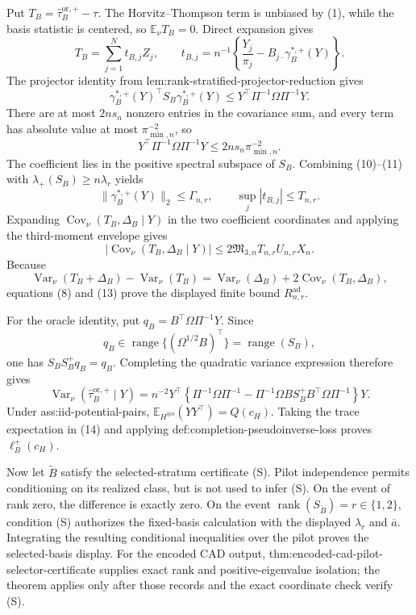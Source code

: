 Put \(T_B=\widehat\tau_B^{\mathrm{or},+}-\tau\).  The Horvitz--Thompson term is unbiased by (1), while the basis statistic is centered, so \(\mathbb E_\nu T_B=0\).  Direct expansion gives
\[
T_B=\sum_{j=1}^{N}t_{B,j}Z_j,
\qquad
t_{B,j}=n^{-1}\left\{\frac{Y_j}{\pi_j}
-B_{j\cdot}\gamma_B^{*,+}(Y)\right\}.
\tag{9}
\]
The projector identity from lem:rank-stratified-projector-reduction gives
\[
\gamma_B^{*,+}(Y)^{\top}S_B\gamma_B^{*,+}(Y)
\le Y^{\top}\Pi^{-1}\Omega\Pi^{-1}Y.
\tag{10}
\]
There are at most \(2ns_n\) nonzero entries in the covariance sum, and every term has absolute value at most \(\pi_{\min,n}^{-2}\), so
\[
Y^{\top}\Pi^{-1}\Omega\Pi^{-1}Y
\le2ns_n\pi_{\min,n}^{-2}.
\tag{11}
\]
The coefficient lies in the positive spectral subspace of \(S_B\).  Combining (10)--(11) with \(\lambda_+(S_B)\ge n\lambda_r\) yields
\[
\lVert\gamma_B^{*,+}(Y)\rVert_2\le\Gamma_{n,r},
\qquad
\sup_j|t_{B,j}|\le T_{n,r}.
\tag{12}
\]
Expanding \(\operatorname{Cov}_\nu(T_B,\Delta_B\mid Y)\) in the two coefficient coordinates and applying the third-moment envelope gives
\[
|\operatorname{Cov}_\nu(T_B,\Delta_B\mid Y)|
\le2\mathfrak M_{3,n}T_{n,r}U_{n,r}X_n.
\tag{13}
\]
Because
\[
\operatorname{Var}_\nu(T_B+\Delta_B)-\operatorname{Var}_\nu(T_B)
=\operatorname{Var}_\nu(\Delta_B)+2\operatorname{Cov}_\nu(T_B,\Delta_B),
\]
equations (8) and (13) prove the displayed finite bound \(R_{n,r}^{\mathrm{ad}}\).

For the oracle identity, put \(q_B=B^{\top}\Omega\Pi^{-1}Y\).  Since
\[
q_B\in\operatorname{range}\{(\Omega^{1/2}B)^{\top}\}
=\operatorname{range}(S_B),
\]
one has \(S_BS_B^+q_B=q_B\).  Completing the quadratic variance expression therefore gives
\[
\operatorname{Var}_\nu(\widehat\tau_B^{\mathrm{or},+}\mid Y)
=n^{-2}Y^{\top}\left\{\Pi^{-1}\Omega\Pi^{-1}
-\Pi^{-1}\Omega BS_B^+B^{\top}\Omega\Pi^{-1}\right\}Y.
\tag{14}
\]
Under ass:iid-potential-pairs, \(\mathbb E_{H^{\otimes n}}(YY^{\top})=Q(c_H)\).  Taking the trace expectation in (14) and applying def:completion-pseudoinverse-loss proves \(\ell_B^+(c_H)\).

Now let \(\widetilde B\) satisfy the selected-stratum certificate (S).  Pilot independence permits conditioning on its realized class, but is not used to infer (S).  On the event of rank zero, the difference is exactly zero.  On the event \(\operatorname{rank}(S_{\widetilde B})=r\in\{1,2\}\), condition (S) authorizes the fixed-basis calculation with the displayed \(\lambda_r\) and \(\overline a\).  Integrating the resulting conditional inequalities over the pilot proves the selected-basis display.  For the encoded CAD output, thm:encoded-cad-pilot-selector-certificate supplies exact rank and positive-eigenvalue isolation; the theorem applies only after those records and the exact coordinate check verify (S).

